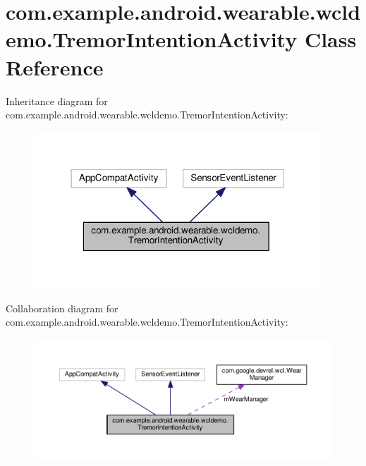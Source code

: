 \hypertarget{classcom_1_1example_1_1android_1_1wearable_1_1wcldemo_1_1TremorIntentionActivity}{}\section{com.\+example.\+android.\+wearable.\+wcldemo.\+Tremor\+Intention\+Activity Class Reference}
\label{classcom_1_1example_1_1android_1_1wearable_1_1wcldemo_1_1TremorIntentionActivity}


Inheritance diagram for com.\+example.\+android.\+wearable.\+wcldemo.\+Tremor\+Intention\+Activity\+:\nopagebreak
\begin{figure}[H]
\begin{center}
\leavevmode
\includegraphics[width=306pt]{d9/ded/classcom_1_1example_1_1android_1_1wearable_1_1wcldemo_1_1TremorIntentionActivity__inherit__graph}
\end{center}
\end{figure}


Collaboration diagram for com.\+example.\+android.\+wearable.\+wcldemo.\+Tremor\+Intention\+Activity\+:\nopagebreak
\begin{figure}[H]
\begin{center}
\leavevmode
\includegraphics[width=350pt]{da/d60/classcom_1_1example_1_1android_1_1wearable_1_1wcldemo_1_1TremorIntentionActivity__coll__graph}
\end{center}
\end{figure}
